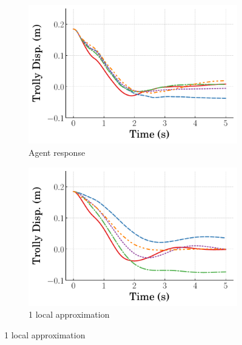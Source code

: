 %
\begin{figure}
    \centering
    \begin{subfigure}[b]{0.32\textwidth}
        \centering
        \includegraphics[width=\textwidth]{figures/figures_Interpretability/Mean_ISE_dpcrane_cubic_1_bins/curve_fit_time_responses/RL_LA/agent_0p18_Trolly_Disp.pdf}
        \caption{Agent response}
        \label{subfig_chap5:dpcrane_RL_LA_trolley_0.185_init_agent_unclipped}
    \end{subfigure}
    \hfill
    \begin{subfigure}[b]{0.32\textwidth}
        \centering
        \includegraphics[width=\textwidth]{figures/figures_Interpretability/Mean_ISE_dpcrane_cubic_1_bins/curve_fit_time_responses/RL_LA/curve_fit_0p18_Trolly_Disp.pdf}
        \caption{1 local approximation}
        \label{subfig_chap5:dpcrane_RL_LA_trolley_0.185_init_curve_fit_1_bins_unclipped}
    \end{subfigure}

\end{figure}
